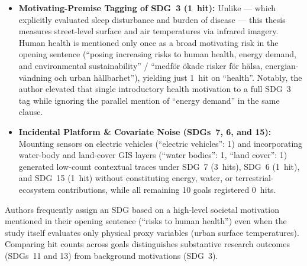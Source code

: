 \begin{casestudySection}
\begin{itemize}
    \item \textbf{Motivating-Premise Tagging of \gls{SDG}~3 (\num{1}~hit):} Unlike  --- which explicitly evaluated sleep disturbance and burden of disease --- this thesis measures street-level surface and air temperatures via infrared imagery. Human health is mentioned only once as a broad motivating risk in the opening sentence (\enquote{posing increasing risks to human health, energy demand, and environmental sustainability} / \enquote{\foreignlanguage{swedish}{medför ökade risker för hälsa, energianvändning och urban hållbarhet}}), yielding just \num{1}~hit on \enquote{health}. Notably, the author elevated that single introductory health motivation to a full \gls{SDG}~3 tag while ignoring the parallel mention of \enquote{energy demand} in the same clause.

    \item \textbf{Incidental Platform \& Covariate Noise (\glspl{SDG}~7, 6, and 15):} Mounting sensors on electric vehicles (\enquote{electric vehicles}: 1) and incorporating water-body and land-cover \gls{GIS} layers (\enquote{water bodies}: 1, \enquote{land cover}: 1) generated low-count contextual traces under \gls{SDG}~7 (\num{3}~hits), \gls{SDG}~6 (\num{1}~hit), and \gls{SDG}~15 (\num{1}~hit) without constituting energy, water, or terrestrial-ecosystem contributions, while all remaining \num{10} goals registered \num{0}~hits.
\end{itemize}
\end{casestudySection}

\begin{takeaway}
Authors frequently assign an \gls{SDG} based on a high-level societal motivation mentioned in their opening sentence (\eg \enquote{risks to human health}) even when the study itself evaluates only physical proxy variables (\eg urban surface temperatures). Comparing hit counts across goals distinguishes substantive research outcomes (\glspl{SDG}~11 and 13) from background motivations (\gls{SDG}~3).
\end{takeaway}

